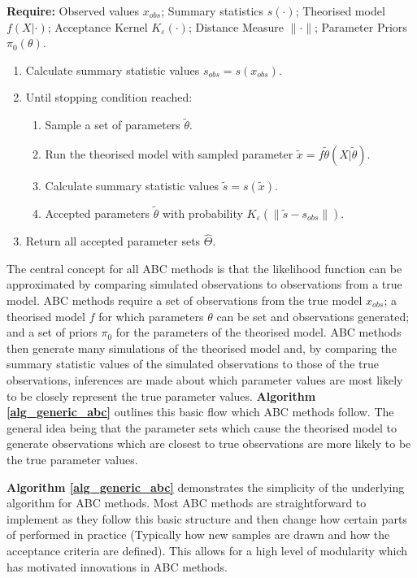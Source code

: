 \documentclass[11pt,a4paper]{article}
\theoremstyle{break}
\begin{document}
  \begin{box_algorithm}\label{alg_generic_abc}
    \textbf{Require:} Observed values $x_{obs}$; Summary statistics $s(\cdot)$; Theorised model $f(X|\cdot)$; Acceptance Kernel $K_\varepsilon(\cdot)$; Distance Measure $\|\cdot\|$; Parameter Priors $\pi_0(\theta)$.
    \begin{enumerate}
      \item Calculate summary statistic values $s_{obs}=s(x_{obs})$.
      \item Until stopping condition reached:
      \begin{enumerate}
        \item Sample a set of parameters $\tilde\theta$.
        \item Run the theorised model with sampled parameter $\tilde{x}=f\tilde\theta(X|\tilde\theta)$.
        \item Calculate summary statistic values $\tilde{s}=s(\tilde{x})$.
        \item Accepted parameters $\tilde\theta$ with probability $K_\varepsilon(\|\tilde{s}-s_{obs}\|)$.
      \end{enumerate}
      \item Return all accepted parameter sets $\hat\Theta$.
    \end{enumerate}
  \end{box_algorithm}

  \par The central concept for all ABC methods is that the likelihood function can be approximated by comparing simulated observations to observations from a true model. ABC methods require a set of observations from the true model $x_{obs}$; a theorised model $f$ for which parameters $\theta$ can be set and observations generated; and a set of priors $\pi_0$ for the parameters of the theorised model. ABC methods then generate many simulations of the theorised model and, by comparing  the summary statistic values of the simulated observations to those of the true observations, inferences are made about which parameter values are most likely to be closely represent the true parameter values. \textbf{Algorithm \ref{alg_generic_abc}} outlines this basic flow which ABC methods follow. The general idea being that the parameter sets which cause the theorised model to generate observations which are closest to true observations are more likely to be the true parameter values.

  \par \textbf{Algorithm \ref{alg_generic_abc}} demonstrates the simplicity of the underlying algorithm for ABC methods. Most ABC methods are straightforward to implement as they follow this basic structure and then change how certain parts of performed in practice (Typically how new samples are drawn and how the acceptance criteria are defined). This allows for a high level of modularity which has motivated innovations in ABC methods.
\end{document}
